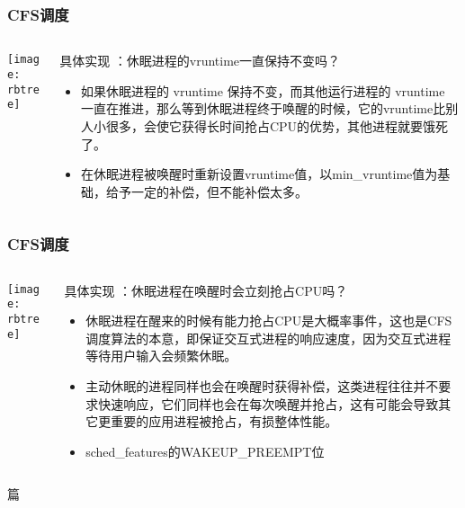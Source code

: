 \begin{frame}
	\frametitle{CFS调度}
	\begin{columns}
		\begin{column}{.4\textwidth}
			\Large \centering
			
			\texttt{[image: rbtree]}
			
		\end{column}
		
		\begin{column}{.6\textwidth}
			
			具体实现 ：休眠进程的vruntime一直保持不变吗？
			\begin{itemize}
				\item 如果休眠进程的 vruntime 保持不变，而其他运行进程的 vruntime 一直在推进，那么等到休眠进程终于唤醒的时候，它的vruntime比别人小很多，会使它获得长时间抢占CPU的优势，其他进程就要饿死了。

				\item 在休眠进程被唤醒时重新设置vruntime值，以min\_vruntime值为基础，给予一定的补偿，但不能补偿太多。
			\end{itemize}
		\end{column}
	\end{columns}
\end{frame}


\begin{frame}
	\frametitle{CFS调度}
	\begin{columns}
		\begin{column}{.4\textwidth}
			\Large \centering
			
			\texttt{[image: rbtree]}
			
		\end{column}
		
		\begin{column}{.6\textwidth}
			
			具体实现 ：休眠进程在唤醒时会立刻抢占CPU吗？
			\begin{itemize}
				\item 休眠进程在醒来的时候有能力抢占CPU是大概率事件，这也是CFS调度算法的本意，即保证交互式进程的响应速度，因为交互式进程等待用户输入会频繁休眠。
				
				\item 主动休眠的进程同样也会在唤醒时获得补偿，这类进程往往并不要求快速响应，它们同样也会在每次唤醒并抢占，这有可能会导致其它更重要的应用进程被抢占，有损整体性能。
				\item sched\_features的WAKEUP\_PREEMPT位
				
			\end{itemize}
		\end{column}
	\end{columns}
篇\end{frame}


